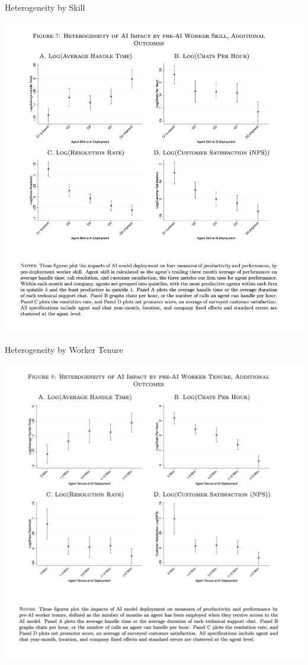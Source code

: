 \documentclass{beamer}
\begin{document}
\begin{frame}{Heterogeneity by Skill}
\begin{center}
\includegraphics[scale=0.25]{./lecture_includes/brynn6}
\end{center}
\end{frame}

\begin{frame}{Heterogeneity by Worker Tenure}
\begin{center}
\includegraphics[scale=0.35]{./lecture_includes/brynn7}
\end{center}
\end{frame}
\end{document}
